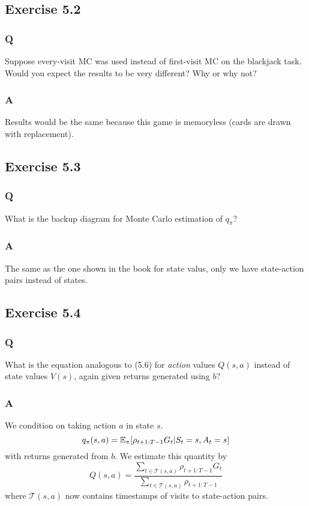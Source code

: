 \subsection{Exercise 5.2}
\subsubsection{Q}
Suppose every-visit MC was used instead of first-visit MC on the blackjack task. Would you expect the results to be very different? Why or why not?

\subsubsection{A}
Results would be the same because this game is memoryless (cards are drawn with replacement).

\subsection{Exercise 5.3}
\subsubsection{Q}
What is the backup diagram for Monte Carlo estimation of $q_\pi$?

\subsubsection{A}
The same as the one shown in the book for state valus, only we have state-action pairs instead of states.

\subsection{Exercise 5.4}
\subsubsection{Q}
What is the equation analogous to (5.6) for \emph{action} values $Q(s, a)$ instead of state values $V(s)$, again given returns generated using $b$?
\subsubsection{A}
We condition on taking action $a$ in state $s$.
\[
    q_\pi(s, a) = \mathbb{E}_\pi{}[\rho_{t+1:T-1} G_t | S_t = s, A_t = s]
\]
with returns generated from $b$. We estimate this quantity by
\[
    Q(s, a) = \frac{\sum_{t \in \mathcal{T}(s, a)} \rho_{t+1:T-1} G_t}{\sum_{t \in \mathcal{T}(s, a)} \rho_{t+1:T-1}}
\]
where $\mathcal{T}(s, a)$ now contains timestamps of visits to state-action pairs.

